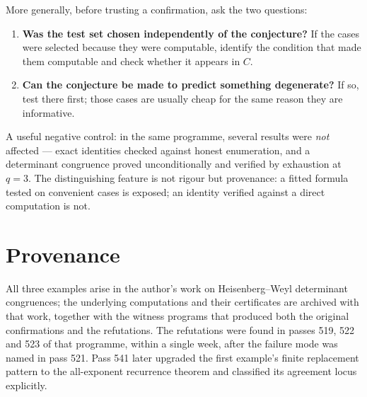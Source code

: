 \documentclass[11pt]{article}
\theoremstyle{plain}
\theoremstyle{definition}
\begin{document}
More generally, before trusting a confirmation, ask the two questions:

\begin{enumerate}
\item \textbf{Was the test set chosen independently of the conjecture?} If the
cases were selected because they were computable, identify the condition that
made them computable and check whether it appears in $C$.
\item \textbf{Can the conjecture be made to predict something degenerate?} If
so, test there first; those cases are usually cheap for the same reason they
are informative.
\end{enumerate}

A useful negative control: in the same programme, several results were
\emph{not} affected --- exact identities checked against honest enumeration,
and a determinant congruence proved unconditionally and verified by exhaustion
at $q=3$. The distinguishing feature is not rigour but provenance: a fitted
formula tested on convenient cases is exposed; an identity verified against a
direct computation is not.

\section*{Provenance}

All three examples arise in the author's work on Heisenberg--Weyl determinant
congruences; the underlying computations and their certificates are archived
with that work, together with the witness programs that produced both the
original confirmations and the refutations. The refutations were found in
passes 519, 522 and 523 of that programme, within a single week, after the
failure mode was named in pass 521.  Pass 541 later upgraded the first
example's finite replacement pattern to the all-exponent recurrence theorem
and classified its agreement locus explicitly.
\end{document}
